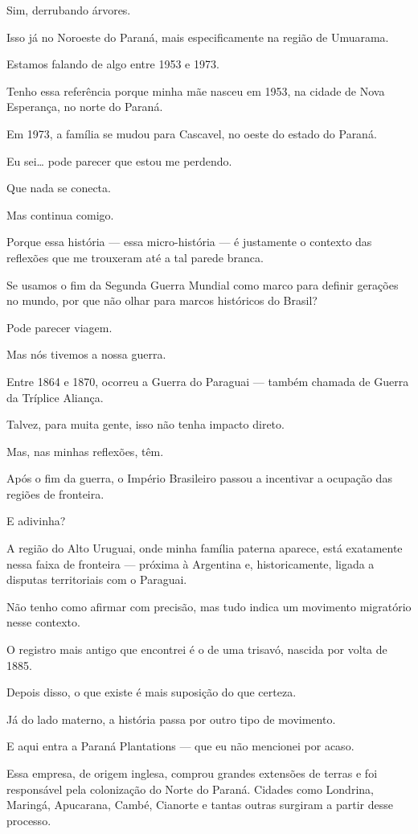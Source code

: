 Sim, derrubando árvores.

Isso já no Noroeste do Paraná, mais especificamente na região de Umuarama.

Estamos falando de algo entre 1953 e 1973.

Tenho essa referência porque minha mãe nasceu em 1953, na cidade de Nova Esperança, no norte do Paraná. 

Em 1973, a família se mudou para Cascavel, no oeste do estado do Paraná.


Eu sei… pode parecer que estou me perdendo.

Que nada se conecta.

Mas continua comigo.

Porque essa história — essa micro-história — é justamente o contexto das reflexões que me trouxeram até a tal parede branca.

Se usamos o fim da Segunda Guerra Mundial como marco para definir gerações no mundo, por que não olhar para marcos históricos do Brasil?

Pode parecer viagem.

Mas nós tivemos a nossa guerra.

Entre 1864 e 1870, ocorreu a Guerra do Paraguai — também chamada de Guerra da Tríplice Aliança.

Talvez, para muita gente, isso não tenha impacto direto.

Mas, nas minhas reflexões, têm.

Após o fim da guerra, o Império Brasileiro passou a incentivar a ocupação das regiões de fronteira.

E adivinha?

A região do Alto Uruguai, onde minha família paterna aparece, está exatamente nessa faixa de fronteira — próxima à Argentina e, historicamente, ligada a disputas territoriais com o Paraguai.

Não tenho como afirmar com precisão, mas tudo indica um movimento migratório nesse contexto.

O registro mais antigo que encontrei é o de uma trisavó, nascida por volta de 1885.

Depois disso, o que existe é mais suposição do que certeza.

Já do lado materno, a história passa por outro tipo de movimento.

E aqui entra a Paraná Plantations — que eu não mencionei por acaso.

Essa empresa, de origem inglesa, comprou grandes extensões de terras e foi responsável pela colonização do Norte do Paraná. Cidades como Londrina, Maringá, Apucarana, Cambé, Cianorte e tantas outras surgiram a partir desse processo.

